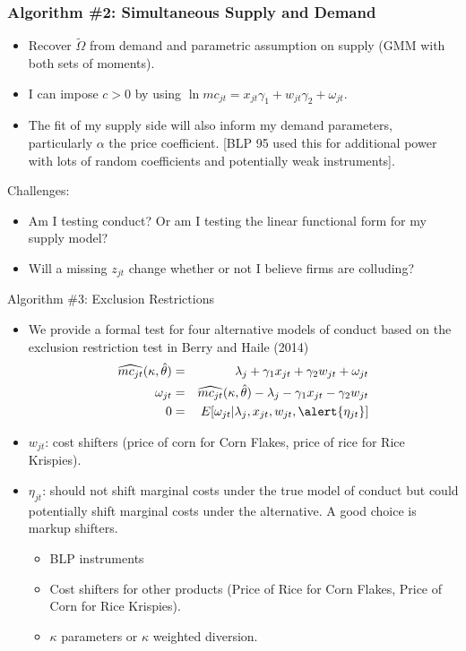 \documentclass[xcolor=pdftex,dvipsnames,table,mathserif]{beamer}
\begin{document}
\begin{frame}
\frametitle{Algorithm \#2: Simultaneous Supply and Demand}
\begin{itemize}
\item Recover $\tilde{\Omega}$ from demand and parametric assumption on supply (GMM with both sets of moments).
\item I can impose $c > 0$ by using $\ln mc_{jt} = x_{jt} \gamma_1 + w_{jt} \gamma_2 + \omega_{jt}$.
\item The fit of my supply side will also inform my demand parameters, particularly $\alpha$ the price coefficient. [BLP 95 used this for additional power with lots of random coefficients and potentially weak instruments].
\end{itemize}
Challenges:
\begin{itemize}
\item Am I testing conduct? Or am I testing the linear functional form for my supply model?
\item Will a missing $z_{jt}$ change whether or not I believe firms are colluding?
\end{itemize}
\end{frame}



\begin{frame}{\normalsize Algorithm \#3: Exclusion Restrictions}
\small
\begin{itemize}
\item We provide a formal test for four alternative models of conduct based on the exclusion restriction test in Berry and Haile (2014) 
\begin{eqnarray*}
\widehat{mc_{jt}}(\kappa,\hat{\theta}) &=& \lambda_j +  \gamma_1 x_{jt} + \gamma_2 w_{jt} + \omega_{jt}\\
\omega_{jt} &=& \widehat{mc_{jt}}(\kappa,\hat{\theta}) - \lambda_j -  \gamma_1 x_{jt} - \gamma_2 w_{jt} \\
0 &=& E[ \omega_{jt} | \lambda_j, x_{jt}, w_{jt}, \alert{\eta_{jt}}]
\end{eqnarray*}
\item $w_{jt}$: cost shifters (price of corn for Corn Flakes, price of rice for Rice Krispies).
\item $\eta_{jt}$: should \alert{not} shift marginal costs under the true model of conduct but could potentially shift marginal costs under the alternative. A good choice is \alert{markup shifters}.
\begin{itemize}
\item BLP instruments
\item Cost shifters for other products (Price of Rice for Corn Flakes, Price of Corn for Rice Krispies).
\item $\kappa$ parameters or $\kappa$ weighted diversion.
\end{itemize}
\end{itemize}
\end{frame}
\end{document}
